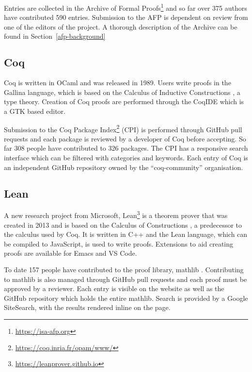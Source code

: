 \documentclass[bsc,frontabs,oneside,singlespacing,parskip,deptreport,logo]{infthesis}
\begin{document}
Entries are collected in the Archive of Formal Proofs\footnote{\url{https://isa-afp.org}} and so far over 375 authors have contributed 590 entries. Submission to the AFP is dependent on review from one of the editors of the project. A thorough description of the Archive can be found in Section~\ref{afp-background}

\subsection{Coq}

Coq is written in OCaml and was released in 1989. Users write proofs in the Gallina language, which is based on the Calculus of Inductive Constructions \cite{DBLP:conf/tapsoft/Huet87}, a type theory. Creation of Coq proofs are performed through the CoqIDE which is a GTK based editor. 

Submission to the Coq Package Index\footnote{\url{https://coq.inria.fr/opam/www/}} (CPI) is performed through GitHub pull requests and each package is reviewed by a developer of Coq before accepting. So far 308 people have contributed to 326 packages. The CPI has a responsive search interface which can be filtered with categories and keywords. Each entry of Coq is an independent GitHub repository owned by the ``coq-community'' organisation.

\subsection{Lean}

A new research project from Microsoft, Lean\footnote{\url{https://leanprover.github.io}} is a theorem prover that was created in 2013 and is based on the Calculus of Constructions \cite{coquand1988calculus}, a predecessor to the calculus used by Coq. It is written in C++ and the Lean language, which can be compiled to JavaScript, is used to write proofs. Extensions to aid creating proofs are available for Emacs and VS Code. 

To date 157 people have contributed to the proof library, mathlib \cite{mathlib_Community_2020}. Contributing to mathlib is also managed through GitHub pull requests and each proof must be approved by a reviewer. Each entry is visible on the website as well as the GitHub repository which holds the entire mathlib. Search is provided by a Google SiteSearch, with the results rendered inline on the page.


\end{document}
